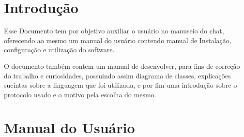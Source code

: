 \documentclass{abnt}
\begin{document}






\capa

\folhaderosto

\tableofcontents


\chapter{Introdução}
Esse Documento tem por objetivo auxiliar o usuário no manuseio do chat, oferecendo ao mesmo um manual do usuário contendo manual de Instalação, configuração e utilização do software.

O documento também contem um manual de desenvolver, para fins de correção do trabalho e curiosidades, possuindo assim diagrama de classes, explicações sucintas sobre a linguagem que foi utilizada, e por fim uma introdução sobre o protocolo usado e o motivo pela escolha do mesmo.

\clearpage
\chapter{Manual do Usuário}
\end{document}
